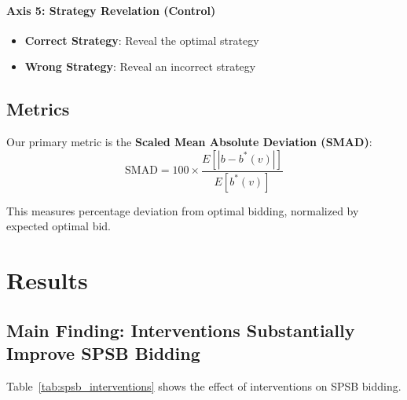 \documentclass[12pt]{article}
\begin{document}
\paragraph{Axis 5: Strategy Revelation (Control)}
\begin{itemize}
    \item \textbf{Correct Strategy}: Reveal the optimal strategy
    \item \textbf{Wrong Strategy}: Reveal an incorrect strategy
\end{itemize}

\subsection{Metrics}

Our primary metric is the \textbf{Scaled Mean Absolute Deviation (SMAD)}:
\begin{equation}
    \text{SMAD} = 100 \times \frac{E[|b - b^*(v)|]}{E[b^*(v)]}
\end{equation}

This measures percentage deviation from optimal bidding, normalized by expected optimal bid.

\section{Results}

\subsection{Main Finding: Interventions Substantially Improve SPSB Bidding}

Table~\ref{tab:spsb_interventions} shows the effect of interventions on SPSB bidding.
\end{document}
